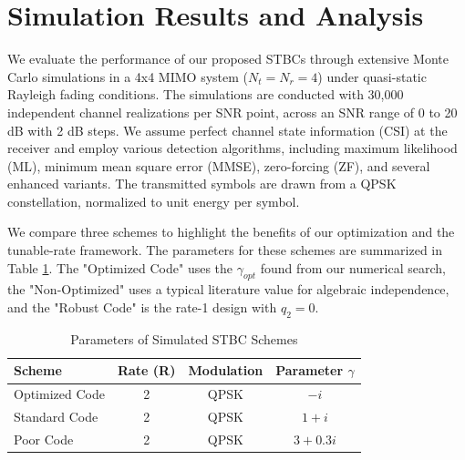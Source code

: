 \section{Simulation Results and Analysis}
We evaluate the performance of our proposed STBCs through extensive Monte Carlo simulations in a 4x4 MIMO system (\(N_t = N_r = 4\)) under quasi-static Rayleigh fading conditions. The simulations are conducted with 30,000 independent channel realizations per SNR point, across an SNR range of 0 to 20 dB with 2 dB steps. We assume perfect channel state information (CSI) at the receiver and employ various detection algorithms, including maximum likelihood (ML), minimum mean square error (MMSE), zero-forcing (ZF), and several enhanced variants. The transmitted symbols are drawn from a QPSK constellation, normalized to unit energy per symbol.

We compare three schemes to highlight the benefits of our optimization and the tunable-rate framework. The parameters for these schemes are summarized in Table \ref{tab:params}. The "Optimized Code" uses the \(\gamma_{opt}\) found from our numerical search, the "Non-Optimized" uses a typical literature value for algebraic independence, and the "Robust Code" is the rate-1 design with \(q_2 = 0\).

\begin{table}[h]
\caption{Parameters of Simulated STBC Schemes}
\label{tab:params}
\centering
\begin{tabular}{|l|c|c|c|}
\hline
\textbf{Scheme} & \textbf{Rate (R)} & \textbf{Modulation} & \textbf{Parameter \(\gamma\)} \\
\hline
Optimized Code & 2 & QPSK & \(-i\) \\
Standard Code & 2 & QPSK & \(1 + i\) \\
Poor Code & 2 & QPSK & \(3 + 0.3i\) \\
\hline
\end{tabular}
\end{table}

